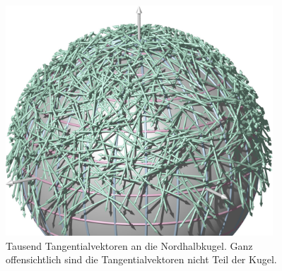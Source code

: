%
%
%
\begin{figure}
\centering
\includegraphics[width=10cm]{chapters/020-koordinaten/images/tangentialvektoren.jpg}
\caption{Tausend Tangentialvektoren an die Nordhalbkugel.
Ganz offensichtlich sind die Tangentialvektoren nicht Teil der Kugel.
\label{buch:koordinaten:fig:tangentialvektoren}}
\end{figure}
